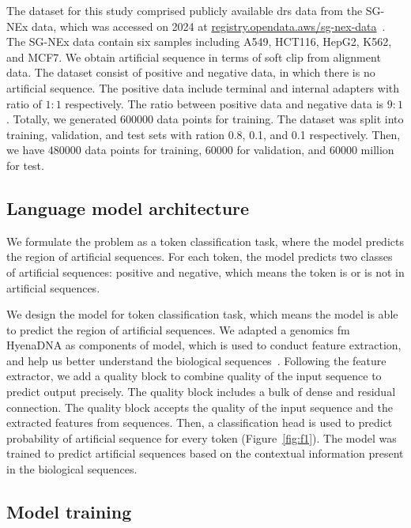 \documentclass[pdflatex, sn-mathphys-num, lineno]{sn-jnl}%
\theoremstyle{thmstyleone}%
\theoremstyle{thmstyletwo}%
\theoremstyle{thmstylethree}%
\begin{document}
The dataset for this study comprised publicly available \gls{drs} data from the SG-NEx data, which was accessed on 2024 at \url{registry.opendata.aws/sg-nex-data}~\cite{chen2021systematic}.
The SG-NEx data contain six samples including A549, HCT116, HepG2, K562, and MCF7.
We obtain artificial sequence in terms of soft clip from alignment data.
The dataset consist of positive and negative data, in which there is no artificial sequence.
The positive data include terminal and  internal adapters with ratio of \( 1:1 \) respectively.
The ratio between positive data  and negative data is \( 9:1 \).
Totally, we generated \num{600000} data points for training.
The dataset was split into training, validation, and test sets with ration \num{0.8}, \num{0.1}, and \num{0.1} respectively.
Then, we have \num{480000} data points for training, \num{60000} for validation, and \num{60000} million for test.

\subsection{Language model architecture}\label{ssec:lm}

We formulate the problem as a token classification task, where the model predicts the region of artificial sequences.
For each token, the model predicts two classes of artificial sequences: positive and negative, which means the token is or is not in artificial sequences.

We design the model for token classification task, which means the model is able to predict the region of artificial sequences.
We adapted a genomics \gls{fm} HyenaDNA as components of model, which is used to conduct feature extraction, and help us better understand the biological sequences~\cite{nguyen2024hyenadna}.
Following the feature extractor, we add a quality block to combine quality of the input sequence to predict output precisely.
The quality block includes a bulk of dense and residual connection.
The quality block accepts the quality of the input sequence and the extracted features from sequences.
Then, a classification head is used to predict probability of artificial sequence for every token (Figure~\ref{fig:f1}).
The model was trained to predict  artificial sequences based on the contextual information present in the biological sequences.

\subsection{Model training}\label{ssec:training}
\end{document}
